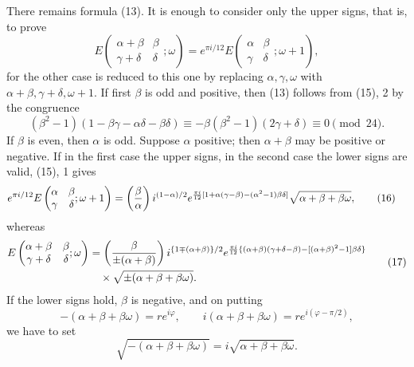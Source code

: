 \documentclass[11pt]{article}
\newcommand{\Jac}[2]{\left(\frac{#1}{#2}\right)}
\begin{document}
There remains formula (13). It is enough to consider only the upper signs, that is, to prove
\[
E\left(\begin{matrix}\alpha+\beta&\beta\\ \gamma+\delta&\delta\end{matrix};\omega\right)
=e^{\pi i/12}E\left(\begin{matrix}\alpha&\beta\\ \gamma&\delta\end{matrix};\omega+1\right),
\]
for the other case is reduced to this one by replacing $\alpha,\gamma,\omega$ with $\alpha+\beta,\gamma+\delta,
\omega+1$. If first $\beta$ is odd and positive, then (13) follows from (15), 2 by the congruence
\[
(\beta^2-1)(1-\beta\gamma-\alpha\delta-\beta\delta)
\equiv-\beta(\beta^2-1)(2\gamma+\delta)\equiv0\pmod{24}.
\]
If $\beta$ is even, then $\alpha$ is odd. Suppose $\alpha$ positive; then $\alpha+\beta$ may be positive or negative. If in the first case the upper signs, in the second case the lower signs are valid, (15), 1 gives
\begin{align}
e^{\pi i/12}E\left(\begin{matrix}\alpha&\beta\\ \gamma&\delta\end{matrix};\omega+1\right)
&=\Jac{\beta}{\alpha}i^{(1-\alpha)/2}
 e^{{\pi i\over12}[1+\alpha(\gamma-\beta)-(\alpha^2-1)\beta\delta]}
\sqrt{\alpha+\beta+\beta\omega}, \tag{16}
\end{align}
whereas
\begin{equation}
\begin{aligned}
E\left(\begin{matrix}\alpha+\beta&\beta\\ \gamma+\delta&\delta\end{matrix};\omega\right)
&=\Jac{\beta}{\pm(\alpha+\beta)}
 i^{\{1\mp(\alpha+\beta)\}/2}
 e^{{\pi i\over12}\{(\alpha+\beta)(\gamma+\delta-\beta)-[(\alpha+\beta)^2-1]\beta\delta\}}\\
&\quad\times \sqrt{\pm(\alpha+\beta+\beta\omega)} .
\end{aligned}
\tag{17}
\end{equation}
If the lower signs hold, $\beta$ is negative, and on putting
\[
-(\alpha+\beta+\beta\omega)=re^{i\varphi},
\qquad
 i(\alpha+\beta+\beta\omega)=re^{i(\varphi-\pi/2)},
\]
we have to set
\[
\sqrt{-(\alpha+\beta+
\beta\omega)}=i\sqrt{\alpha+\beta+\beta\omega}.
\]
\end{document}
